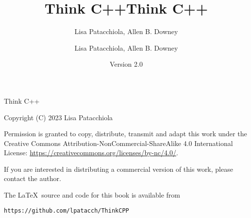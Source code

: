 \documentclass{book}
\title{Think C++}
\author{Lisa Patacchiola, Allen B. Downey}
\date{}
\begin{document}
\title {Think C++}
\author {Lisa Patacchiola, Allen B. Downey}
\date {Version 2.0}
\maketitle

\vspace{2in}
\begin{center}
{\Large Think C++}

\vspace{0.25in}

Copyright (C) 2023 Lisa Patacchiola
\end{center}
\vspace{0.25in}

Permission is granted to copy, distribute, transmit and adapt this
work under the Creative Commons Attribution-NonCommercial-ShareAlike 4.0
International License: \url{https://creativecommons.org/licenses/by-nc/4.0/}.

If you are interested in distributing a commercial version of this
work, please contact the author.

The \LaTeX\ source and code for this book is available from

\begin{verbatim}
https://github.com/lpatacch/ThinkCPP
\end{verbatim}



\frontmatter
\tableofcontents

\mainmatter
















\appendix


\printindex
\end{document}
